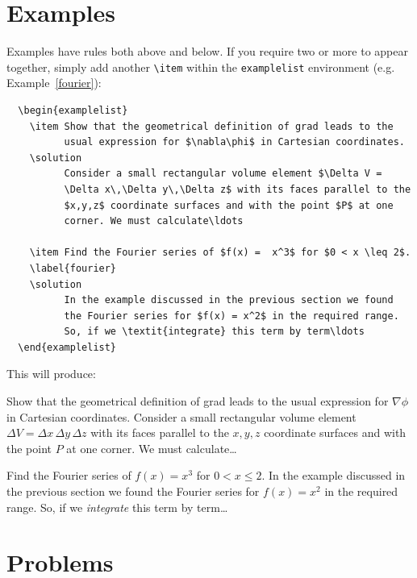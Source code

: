 \section{Examples}
\label{examples}
Examples have rules both above and below. If you require two or more to appear together, simply add another \verb"\item" within the \verb"examplelist" environment (e.g. Example~\ref{fourier}):
\begin{verbatim}
  \begin{examplelist}
    \item Show that the geometrical definition of grad leads to the
          usual expression for $\nabla\phi$ in Cartesian coordinates.
    \solution
          Consider a small rectangular volume element $\Delta V =
          \Delta x\,\Delta y\,\Delta z$ with its faces parallel to the
          $x,y,z$ coordinate surfaces and with the point $P$ at one
          corner. We must calculate\ldots

    \item Find the Fourier series of $f(x) =  x^3$ for $0 < x \leq 2$.
    \label{fourier}
    \solution
          In the example discussed in the previous section we found
          the Fourier series for $f(x) = x^2$ in the required range.
          So, if we \textit{integrate} this term by term\ldots
  \end{examplelist}
\end{verbatim}
This will produce:
  \begin{examplelist}
    \item Show that the geometrical definition of grad leads to the
          usual expression for $\nabla\phi$ in Cartesian coordinates.
    \solution
          Consider a small rectangular volume element $\Delta V =
          \Delta x\,\Delta y\,\Delta z$ with its faces parallel to the
          $x,y,z$ coordinate surfaces and with the point $P$ at one
          corner. We must calculate\ldots

    \item Find the Fourier series of $f(x) =  x^3$ for $0 < x \leq 2$.
    \label{fourier}
    \solution
          In the example discussed in the previous section we found
          the Fourier series for $f(x) = x^2$ in the required range.
          So, if we \textit{integrate} this term by term\ldots
  \end{examplelist}


\section{Problems}

